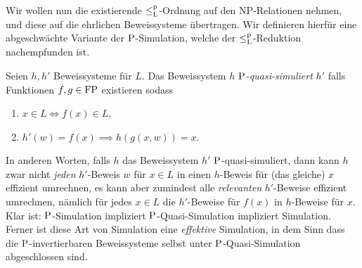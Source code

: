 Wir wollen nun die existierende $\leqlp$-Ordnung auf den NP-Relationen nehmen, und diese auf die ehrlichen Beweissysteme übertragen. Wir definieren hierfür eine abgeschwächte Variante der $\P$-Simulation, welche der $\leqlp$-Reduktion nachempfunden ist.
\begin{definition}
    Seien $h,h'$ Beweissysteme für $L$. Das Beweissystem $h$ \emph{$\P$-quasi-simuliert} $h'$ falls Funktionen $f,g\in\FP$ existieren sodass
    \begin{enumerate}
        \item $x\in L \iff f(x)\in L$,
        \item $ h'(w)=f(x) \implies h(g(x, w)) = x. $\qedhere
    \end{enumerate}
\end{definition}
In anderen Worten, falls $h$ das Beweissystem $h'$ $\P$-quasi-simuliert, dann kann $h$ zwar nicht \emph{jeden} $h'$-Beweis $w$ für $x\in L$ in einen $h$-Beweis für (das gleiche) $x$ effizient umrechnen, es kann aber zumindest alle \emph{relevanten} $h'$-Beweise effizient umrechnen, nämlich für jedes $x\in L$ die $h'$-Beweise für $f(x)$ in $h$-Beweise für $x$.
Klar ist: $\P$-Simulation impliziert $\P$-Quasi-Simulation impliziert Simulation.
Ferner ist diese Art von Simulation eine \emph{effektive} Simulation, in dem Sinn dass die $\P$-invertierbaren Beweissysteme selbst unter $\P$-Quasi-Simulation abgeschlossen sind.


